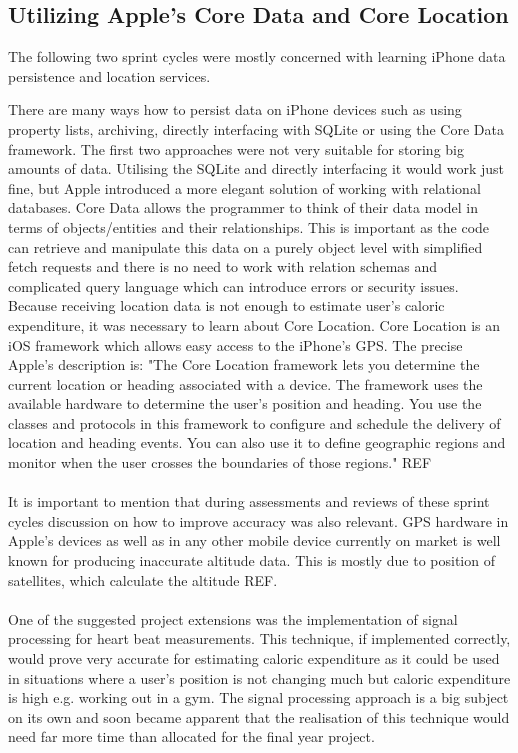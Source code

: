 \documentclass[12pt, a4paper]{report}   %
\begin{document}
\begin{enumerate}
\clearpage
\section{Utilizing Apple's Core Data and Core Location}
The following two sprint cycles were mostly concerned with learning iPhone data persistence and location services.

There are many ways how to persist data on iPhone devices such as using property lists, archiving, directly interfacing with SQLite or using the Core Data framework. The first two approaches were not very suitable for storing big amounts of data. Utilising the SQLite and directly interfacing it would work just fine, but Apple introduced a more elegant solution of working with relational databases. Core Data allows the programmer to think of their data model in terms of objects/entities and their relationships. This is important as the code can retrieve and manipulate this data on a purely object level with simplified fetch requests and there is no need to work with relation schemas and complicated query language which can introduce errors or security issues.
Because receiving location data is not enough to estimate user's caloric expenditure, it was necessary to learn about Core Location.
Core Location is an iOS framework which allows easy access to the iPhone's GPS. The precise Apple's description is:
"The Core Location framework lets you determine the current location or heading associated with a device. The framework uses the available hardware to determine the user's position and heading. You use the classes and protocols in this framework to configure and schedule the delivery of location and heading events. You can also use it to define geographic regions and monitor when the user crosses the boundaries of those regions." REF\\ \\
It is important to mention that during assessments and reviews of these sprint cycles discussion on how to improve accuracy was also relevant. GPS hardware in Apple's devices as well as in any other mobile device currently on market is well known for producing inaccurate altitude data. This is mostly due to position of satellites, which calculate the altitude 
REF.\\ \\
One of the suggested project extensions was the implementation of signal processing for heart beat measurements. This technique, if implemented correctly, would prove very accurate for estimating caloric expenditure as it could be used in situations where a user's position is not changing much but caloric expenditure is high e.g. working out in a gym. The signal processing approach is a big subject on its own and soon became apparent that the realisation of this technique would need far more time than allocated for the final year project.\\ \\

\end{enumerate}
\end{document}

